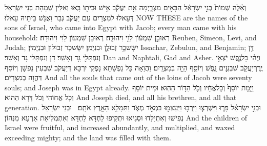 {וְאֵ֗לֶּה שְׁמוֹת֙ בְּנֵ֣י יִשְׂרָאֵ֔ל הַבָּאִ֖ים מִצְרָ֑יְמָה אֵ֣ת יַעֲקֹ֔ב אִ֥ישׁ וּבֵית֖וֹ בָּֽאוּ׃}
{וְאִלֵּין שְׁמָהָת בְּנֵי יִשְׂרָאֵל דְּעָאלוּ לְמִצְרָיִם עִם יַעֲקֹב גְּבַר וַאֲנָשׁ בֵּיתֵיהּ עָאלוּ׃}
{NOW THESE are the names of the sons of Israel, who came into Egypt with Jacob; every man came with his household:}{}
{רְאוּבֵ֣ן שִׁמְע֔וֹן לֵוִ֖י וִיהוּדָֽה׃}
{רְאוּבֵן שִׁמְעוֹן לֵוִי וִיהוּדָה׃}
{Reuben, Simeon, Levi, and Judah;}{}
{יִשָּׂשכָ֥ר זְבוּלֻ֖ן וּבִנְיָמִֽן׃}
{יִשָּׂשכָר זְבוּלוּן וּבִנְיָמִין׃}
{Issachar, Zebulun, and Benjamin;}{}
{דָּ֥ן וְנַפְתָּלִ֖י גָּ֥ד וְאָשֵֽׁר׃}
{דָּן וְנַפְתָּלִי גָּד וְאָשֵׁר׃}
{Dan and Naphtali, Gad and Asher.}{}
{וַֽיְהִ֗י כׇּל\maqqaf נֶ֛פֶשׁ יֹצְאֵ֥י יֶֽרֶךְ\maqqaf יַעֲקֹ֖ב שִׁבְעִ֣ים נָ֑פֶשׁ וְיוֹסֵ֖ף הָיָ֥ה בְמִצְרָֽיִם׃}
{וַהֲוַאָה כָּל נַפְשָׁתָא נָפְקֵי יִרְכָּא דְּיַעֲקֹב שִׁבְעִין נַפְשָׁן וְיוֹסֵף דַּהֲוָה בְמִצְרָיִם׃}
{And all the souls that came out of the loins of Jacob were seventy souls; and Joseph was in Egypt already.}{}
{וַיָּ֤מׇת יוֹסֵף֙ וְכׇל\maqqaf אֶחָ֔יו וְכֹ֖ל הַדּ֥וֹר הַהֽוּא׃}
{וּמִית יוֹסֵף וְכָל אֲחוֹהִי וְכֹל דָּרָא הַהוּא׃}
{And Joseph died, and all his brethren, and all that generation.}{}
{וּבְנֵ֣י יִשְׂרָאֵ֗ל פָּר֧וּ וַֽיִּשְׁרְצ֛וּ וַיִּרְבּ֥וּ וַיַּֽעַצְמ֖וּ בִּמְאֹ֣ד מְאֹ֑ד וַתִּמָּלֵ֥א הָאָ֖רֶץ אֹתָֽם׃ \petucha }
{וּבְנֵי יִשְׂרָאֵל נְפִישׁוּ וְאִתְיַלַּדוּ וּסְגִיאוּ וּתְקִיפוּ לַחְדָּא לַחְדָּא וְאִתְמְלִיאַת אַרְעָא מִנְּהוֹן׃}
{And the children of Israel were fruitful, and increased abundantly, and multiplied, and waxed exceeding mighty; and the land was filled with them.}{}
